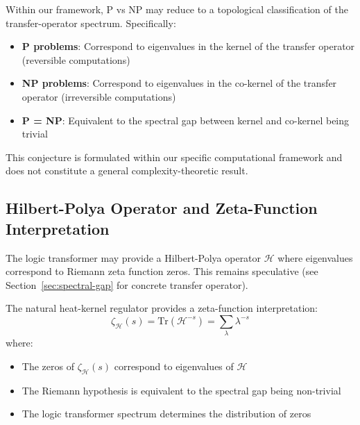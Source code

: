 \begin{conjecture}
\label{conj:p-vs-np-spectrum}
Within our framework, P vs NP may reduce to a topological classification of the transfer-operator spectrum. Specifically:
\begin{itemize}
\item \textbf{P problems}: Correspond to eigenvalues in the kernel of the transfer operator (reversible computations)
\item \textbf{NP problems}: Correspond to eigenvalues in the co-kernel of the transfer operator (irreversible computations)
\item \textbf{P = NP}: Equivalent to the spectral gap between kernel and co-kernel being trivial
\end{itemize}
This conjecture is formulated within our specific computational framework and does not constitute a general complexity-theoretic result.
\end{conjecture}

\subsection{Hilbert-Polya Operator and Zeta-Function Interpretation}

\begin{conjecture}
\label{def:hilbert-polya}
The logic transformer may provide a Hilbert-Polya operator $\mathcal{H}$ where eigenvalues correspond to Riemann zeta function zeros. This remains speculative (see Section~\ref{sec:spectral-gap} for concrete transfer operator).
\end{conjecture}

\begin{theorem}
\label{thm:zeta-interpretation}
The natural heat-kernel regulator provides a zeta-function interpretation:
\[
\zeta_{\mathcal{H}}(s) = \text{Tr}(\mathcal{H}^{-s}) = \sum_{\lambda} \lambda^{-s}
\]
where:
\begin{itemize}
\item The zeros of $\zeta_{\mathcal{H}}(s)$ correspond to eigenvalues of $\mathcal{H}$
\item The Riemann hypothesis is equivalent to the spectral gap being non-trivial
\item The logic transformer spectrum determines the distribution of zeros
\end{itemize}
\end{theorem}

